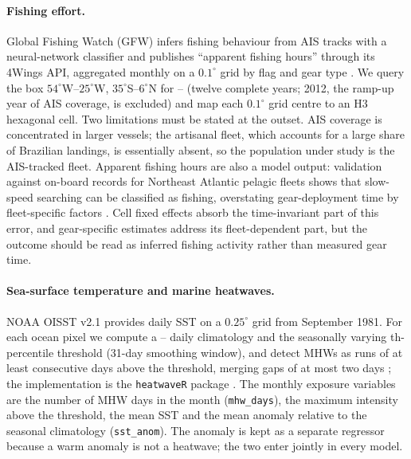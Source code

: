 \documentclass[12pt,a4paper]{article}
\begin{document}
\paragraph{Fishing effort.} Global Fishing Watch (GFW) infers fishing behaviour from AIS tracks with a neural-network classifier and publishes ``apparent fishing hours'' through its 4Wings API, aggregated monthly on a $0.1^{\circ}$ grid by flag and gear type \citep{kroodsma2018}. We query the box $54^{\circ}$W--$25^{\circ}$W, $35^{\circ}$S--$6^{\circ}$N for \panelStart{}--\panelEnd{} (twelve complete years; 2012, the ramp-up year of AIS coverage, is excluded) and map each $0.1^{\circ}$ grid centre to an H3 hexagonal cell. Two limitations must be stated at the outset. AIS coverage is concentrated in larger vessels; the artisanal fleet, which accounts for a large share of Brazilian landings, is essentially absent, so the population under study is the AIS-tracked fleet. Apparent fishing hours are also a model output: validation against on-board records for Northeast Atlantic pelagic fleets shows that slow-speed searching can be classified as fishing, overstating gear-deployment time by fleet-specific factors \citep{hintzen2025}. Cell fixed effects absorb the time-invariant part of this error, and gear-specific estimates address its fleet-dependent part, but the outcome should be read as inferred fishing activity rather than measured gear time.

\paragraph{Sea-surface temperature and marine heatwaves.} NOAA OISST v2.1 provides daily SST on a $0.25^{\circ}$ grid from September 1981. For each ocean pixel we compute a \climStart{}--\climEnd{} daily climatology and the seasonally varying \mhwPctile{}th-percentile threshold (31-day smoothing window), and detect MHWs as runs of at least \mhwMinDuration{} consecutive days above the threshold, merging gaps of at most two days \citep{hobday2016,hobday2018}; the implementation is the \texttt{heatwaveR} package \citep{schlegel2018}. The monthly exposure variables are the number of MHW days in the month (\texttt{mhw\_days}), the maximum intensity above the threshold, the mean SST and the mean anomaly relative to the seasonal climatology (\texttt{sst\_anom}). The anomaly is kept as a separate regressor because a warm anomaly is not a heatwave; the two enter jointly in every model.
\end{document}
